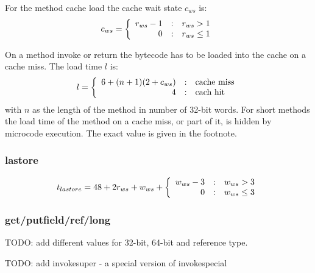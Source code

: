 For the method cache load the cache wait state $c_{ws}$ is:
\begin{equation*}
    c_{ws} =
    \left\{\begin{array}{r@{\quad:\quad}l}
    r_{ws}-1 & r_{ws}>1 \\
    0   & r_{ws}\le1
    \end{array} \right.
\end{equation*}

On a method invoke or return the bytecode has to be loaded into the
cache on a cache miss. The load time $l$ is:
\[
    l =
    \left\{\begin{array}{r@{\quad:\quad}l}
    6+(n+1)(2+c_{ws}) & \mbox{cache miss} \\
    4   & \mbox{cach hit}
    \end{array} \right.
\]
with $n$ as the length of the method in number of 32-bit words. For
short methods the load time of the method on a cache miss, or part
of it, is hidden by microcode execution. The exact value is given in
the footnote.

%

\subsubsection*{lastore}

\begin{equation*}
    t_{lastore} = 48+2r_{ws}+w_{ws} + \left\{\begin{array}{r@{\quad:\quad}l}
    w_{ws}-3 & w_{ws}>3 \\
    0   & w_{ws}\le3
    \end{array} \right.
\end{equation*}

\subsubsection*{get/putfield/ref/long}

TODO: add different values for 32-bit, 64-bit and reference type.

TODO: add invokesuper - a special version of invokespecial

%
